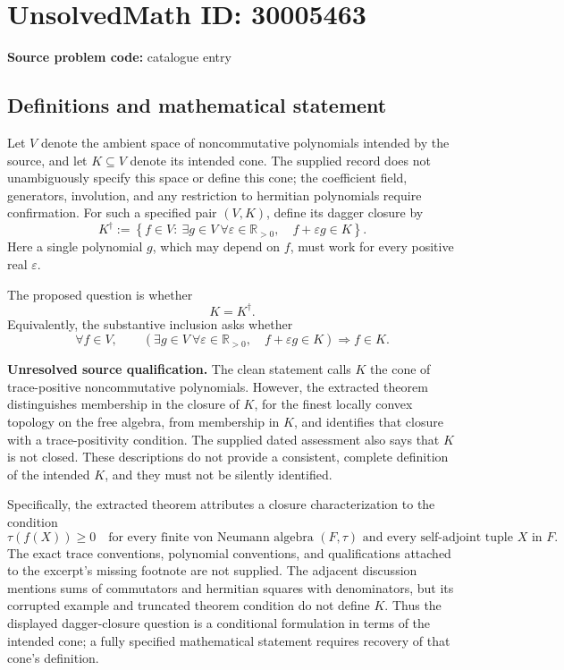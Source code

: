 \documentclass[11pt]{article}
\newcommand{\R}{\mathbb{R}}
\begin{document}
\section*{UnsolvedMath ID: 30005463}
\textbf{Source problem code:} catalogue entry
\subsection{Definitions and mathematical statement}
Let \(V\) denote the ambient space of noncommutative polynomials intended by the source, and let \(K\subseteq V\) denote its intended cone. The supplied record does not unambiguously specify this space or define this cone; the coefficient field, generators, involution, and any restriction to hermitian polynomials require confirmation. For such a specified pair \((V,K)\), define its dagger closure by
\[
K^\dagger:=\left\{f\in V:\ \exists g\in V\ \forall\varepsilon\in\R_{>0},\quad f+\varepsilon g\in K\right\}.
\]
Here a single polynomial \(g\), which may depend on \(f\), must work for every positive real \(\varepsilon\).

The proposed question is whether
\[
K=K^\dagger.
\]
Equivalently, the substantive inclusion asks whether
\[
\forall f\in V,\qquad
\left(\exists g\in V\ \forall\varepsilon\in\R_{>0},\quad f+\varepsilon g\in K\right)
\Longrightarrow f\in K.
\]

\textbf{Unresolved source qualification.} The clean statement calls \(K\) the cone of trace-positive noncommutative polynomials. However, the extracted theorem distinguishes membership in the closure of \(K\), for the finest locally convex topology on the free algebra, from membership in \(K\), and identifies that closure with a trace-positivity condition. The supplied dated assessment also says that \(K\) is not closed. These descriptions do not provide a consistent, complete definition of the intended \(K\), and they must not be silently identified.

Specifically, the extracted theorem attributes a closure characterization to the condition
\[
\tau(f(X))\geq 0
\quad\text{for every finite von Neumann algebra }(F,\tau)
\text{ and every self-adjoint tuple }X\text{ in }F.
\]
The exact trace conventions, polynomial conventions, and qualifications attached to the excerpt's missing footnote are not supplied. The adjacent discussion mentions sums of commutators and hermitian squares with denominators, but its corrupted example and truncated theorem condition do not define \(K\). Thus the displayed dagger-closure question is a conditional formulation in terms of the intended cone; a fully specified mathematical statement requires recovery of that cone's definition.
\end{document}

